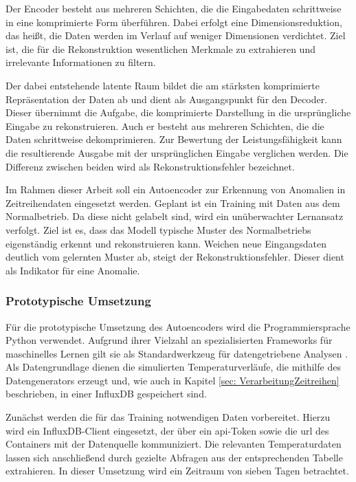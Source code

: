 Der Encoder besteht aus mehreren Schichten, die die Eingabedaten schrittweise in eine komprimierte Form überführen. 
Dabei erfolgt eine Dimensionsreduktion, das heißt, die Daten werden im Verlauf auf weniger Dimensionen verdichtet. 
Ziel ist, die für die Rekonstruktion wesentlichen Merkmale zu extrahieren und irrelevante Informationen zu filtern.

Der dabei entstehende latente Raum bildet die am stärksten komprimierte Repräsentation der Daten ab und dient als Ausgangspunkt für den Decoder.
Dieser übernimmt die Aufgabe, die komprimierte Darstellung in die ursprüngliche Eingabe zu rekonstruieren. 
Auch er besteht aus mehreren Schichten, die die Daten schrittweise dekomprimieren.
Zur Bewertung der Leistungsfähigkeit kann die resultierende Ausgabe mit der ursprünglichen Eingabe verglichen werden. 
Die Differenz zwischen beiden wird als Rekonstruktionsfehler bezeichnet. \cite{Autoencoder}

Im Rahmen dieser Arbeit soll ein Autoencoder zur Erkennung von Anomalien in Zeitreihendaten eingesetzt werden. 
Geplant ist ein Training mit Daten aus dem Normalbetrieb. 
Da diese nicht gelabelt sind, wird ein unüberwachter Lernansatz verfolgt. 
Ziel ist es, dass das Modell typische Muster des Normalbetriebs eigenständig erkennt und rekonstruieren kann. 
Weichen neue Eingangsdaten deutlich vom gelernten Muster ab, steigt der Rekonstruktionsfehler.
Dieser dient als Indikator für eine Anomalie.

\subsubsection{Prototypische Umsetzung}
Für die prototypische Umsetzung des Autoencoders wird die Programmiersprache Python verwendet. 
Aufgrund ihrer Vielzahl an spezialisierten Frameworks für maschinelles Lernen gilt sie als Standardwerkzeug für datengetriebene Analysen \cite{Python}.
Als Datengrundlage dienen die simulierten Temperaturverläufe, die mithilfe des Datengenerators erzeugt und, wie auch in Kapitel \ref{sec: VerarbeitungZeitreihen} beschrieben, in einer InfluxDB gespeichert sind.

Zunächst werden die für das Training notwendigen Daten vorbereitet.
Hierzu wird ein InfluxDB-Client eingesetzt, der über ein \acs{api}-Token sowie die \acs{url} des Containers mit der Datenquelle kommuniziert.
Die relevanten Temperaturdaten lassen sich anschließend durch gezielte Abfragen aus der entsprechenden Tabelle extrahieren.
In dieser Umsetzung wird ein Zeitraum von sieben Tagen betrachtet.

